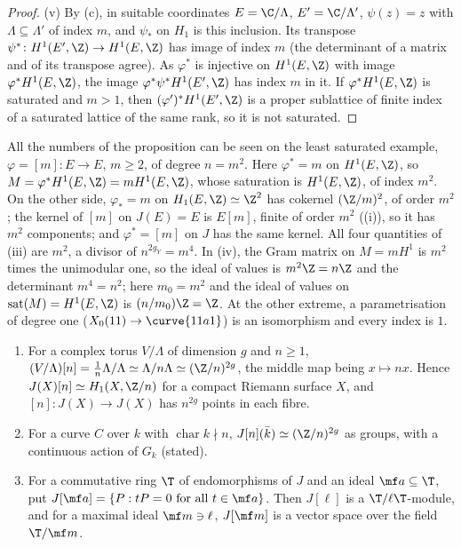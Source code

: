 \begin{proof}
(v) By (c), in suitable coordinates $E=\C/\Lambda$, $E'=\C/\Lambda'$, $\psi(z)=z$ with $\Lambda\subseteq\Lambda'$ of index $m$, and $\psi_*$ on $H_1$ is this inclusion. Its transpose
$\psi^*\colon H^1(E',\Z)\to H^1(E,\Z)$ has image of index $m$ (the determinant of a matrix and of its transpose agree). As $\varphi^*$ is injective on $H^1(E,\Z)$ with image
$\varphi^*H^1(E,\Z)$, the image $\varphi^*\psi^*H^1(E',\Z)$ has index $m$ in it. If $\varphi^*H^1(E,\Z)$ is saturated and $m>1$, then $(\varphi')^*H^1(E',\Z)$ is a proper sublattice of finite index
of a saturated lattice of the same rank, so it is not saturated.
\end{proof}

All the numbers of the proposition can be seen on the least saturated example, $\varphi=[m]\colon E\to E$, $m\ge2$, of degree $n=m^2$. Here $\varphi^*=m$ on
$H^1(E,\Z)$, so $M=\varphi^*H^1(E,\Z)=mH^1(E,\Z)$, whose saturation is $H^1(E,\Z)$, of index $m^2$. On the other side, $\varphi_*=m$ on $H_1(E,\Z)\simeq\Z^2$ has cokernel
$(\Z/m)^2$, of order $m^2$; the kernel of $[m]$ on $J(E)=E$ is $E[m]$, finite of order $m^2$ ((i)), so it has $m^2$ components; and
$\varphi^*=[m]$ on $J$ has the same kernel. All four quantities of (iii) are $m^2$, a divisor of $n^{2g_Y}=m^4$. In (iv), the Gram matrix on $M=mH^1$ is $m^2$ times the
unimodular one, so the ideal of values is $m^2\Z=n\Z$ and the determinant $m^4=n^2$; here $m_0=m^2$ and the ideal of values on $\operatorname{sat}(M)=H^1(E,\Z)$ is
$(n/m_0)\Z=\Z$. At the other extreme, a parametrisation of degree one ($X_0(11)\to\curve{11a1}$) is an isomorphism and every index is $1$.

\begin{proposition}\label{prop:curves:torsion}
\leavevmode
\begin{enumerate}[label=(\roman*)]
\item For a complex torus $V/\Lambda$ of dimension $g$ and $n\ge1$, $(V/\Lambda)[n]=\frac1n\Lambda/\Lambda\simeq\Lambda/n\Lambda\simeq(\Z/n)^{2g}$, the middle map being $x\mapsto nx$. Hence
$J(X)[n]\simeq H_1(X,\Z/n)$ for a compact Riemann surface $X$, and $[n]\colon J(X)\to J(X)$ has $n^{2g}$ points in each fibre.
\item For a curve $C$ over $k$ with $\operatorname{char}k\nmid n$, $J[n](\bar k)\simeq(\Z/n)^{2g}$ as groups, with a continuous action of $G_k$ (stated).
\item For a commutative ring $\T$ of endomorphisms of $J$ and an ideal $\mf a\subseteq\T$, put $J[\mf a]=\{P:tP=0\text{ for all }t\in\mf a\}$. Then $J[\ell]$ is a $\T/\ell\T$-module, and for a
maximal ideal $\mf m\ni\ell$, $J[\mf m]$ is a vector space over the field $\T/\mf m$.
\end{enumerate}
\end{proposition}

